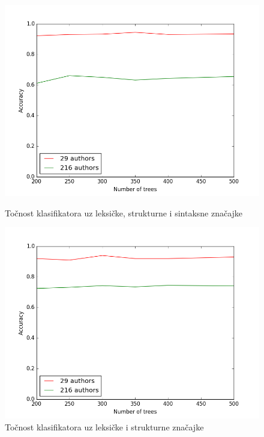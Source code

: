 \begin{figure}[htb]
  \centering
  \begin{minipage}[b]{0.4\textwidth}
    \includegraphics[width=\textwidth]{fig/ig_sve_znacajke.png}
    \caption{Točnost klasifikatora uz leksičke, strukturne i sintaksne značajke}
    \label{sve_znacajke_ig}
  \end{minipage}
  \hfill
  \begin{minipage}[b]{0.4\textwidth}
    \includegraphics[width=\textwidth]{fig/leksicke_fs.png}
    \caption{Točnost klasifikatora uz leksičke i strukturne značajke}
    \label{leksicke_ig}
  \end{minipage}
\end{figure}

